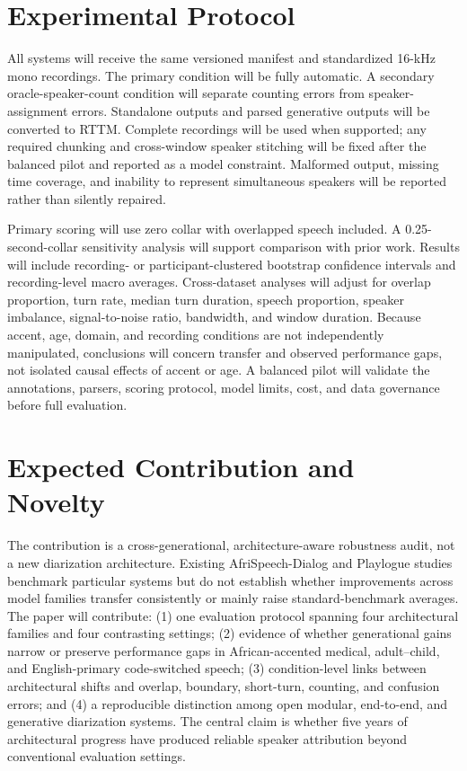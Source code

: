 \documentclass[conference,onecolumn]{IEEEtran}
\begin{document}
\section{Experimental Protocol}

All systems will receive the same versioned manifest and standardized 16-kHz
mono recordings. The primary condition will be fully automatic. A secondary
oracle-speaker-count condition will separate counting errors from
speaker-assignment errors. Standalone outputs and parsed generative outputs
will be converted to RTTM. Complete recordings will be used when supported;
any required chunking and cross-window speaker stitching will be fixed after
the balanced pilot and reported as a model constraint. Malformed output,
missing time coverage, and inability to represent simultaneous speakers will
be reported rather than silently repaired.

Primary scoring will use zero collar with overlapped speech included. A
0.25-second-collar sensitivity analysis will support comparison with prior
work. Results will include recording- or participant-clustered bootstrap
confidence intervals and recording-level macro averages. Cross-dataset analyses will adjust for overlap
proportion, turn rate, median turn duration, speech proportion, speaker
imbalance, signal-to-noise ratio, bandwidth, and window duration. Because
accent, age, domain, and recording conditions are not independently
manipulated, conclusions will concern transfer and observed performance gaps,
not isolated causal effects of accent or age. A balanced pilot will validate
the annotations, parsers, scoring protocol, model limits, cost, and data
governance before full evaluation.

\section{Expected Contribution and Novelty}

The contribution is a cross-generational, architecture-aware robustness audit,
not a new diarization architecture. Existing AfriSpeech-Dialog and Playlogue
studies benchmark particular systems but do not establish whether improvements
across model families transfer consistently or mainly raise standard-benchmark
averages. The paper will contribute: (1) one evaluation protocol spanning four
architectural families and four contrasting settings; (2) evidence of whether
generational gains narrow or preserve performance gaps in African-accented
medical, adult--child, and English-primary code-switched speech; (3)
condition-level links between architectural shifts and overlap, boundary,
short-turn, counting, and confusion errors; and (4) a reproducible distinction
among open modular, end-to-end, and generative diarization systems. The central
claim is whether five years of architectural progress have produced reliable
speaker attribution beyond conventional evaluation settings.
\end{document}
